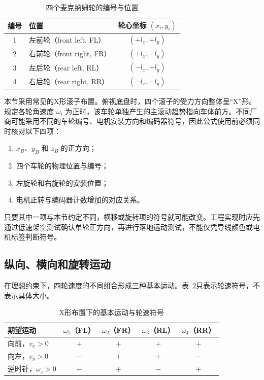 \documentclass[UTF8,zihao=-4]{ctexart}
\begin{document}
\begin{table}[htbp]
  \centering
  \caption{四个麦克纳姆轮的编号与位置}
  \label{tab:wheel-numbering}
  \begin{tabular}{clc}
    \toprule
    编号 & 位置 & 轮心坐标 $(x_i,y_i)$ \\
    \midrule
    1 & 左前轮（front left, FL）  & $(+l_x,+l_y)$ \\
    2 & 右前轮（front right, FR） & $(+l_x,-l_y)$ \\
    3 & 左后轮（rear left, RL）   & $(-l_x,+l_y)$ \\
    4 & 右后轮（rear right, RR）  & $(-l_x,-l_y)$ \\
    \bottomrule
  \end{tabular}
\end{table}

本节采用常见的X形滚子布置。俯视底盘时，四个滚子的受力方向整体呈“X”形。规定各轮角速度 $\omega_i$ 为正时，该车轮单独产生的主滚动趋势指向车体前方。不同厂商可能采用不同的车轮编号、电机安装方向和编码器符号，因此公式使用前必须同时核对以下四项：
\begin{enumerate}
  \item $x_B$、$y_B$ 和 $z_B$ 的正方向；
  \item 四个车轮的物理位置与编号；
  \item 左旋轮和右旋轮的安装位置；
  \item 电机正转与编码器计数增加的对应关系。
\end{enumerate}

只要其中一项与本节约定不同，横移或旋转项的符号就可能改变。工程实现时应先通过低速架空测试确认单轮正方向，再进行落地运动测试，不能仅凭导线颜色或电机标签判断符号。

\subsection{纵向、横向和旋转运动}

在理想约束下，四轮速度的不同组合形成三种基本运动。表~\ref{tab:basic-motion}只表示轮速符号，不表示具体大小。

\begin{table}[htbp]
  \centering
  \caption{X形布置下的基本运动与轮速符号}
  \label{tab:basic-motion}
  \begin{tabular}{lcccc}
    \toprule
    期望运动 & $\omega_1$（FL） & $\omega_2$（FR） & $\omega_3$（RL） & $\omega_4$（RR） \\
    \midrule
    向前，$v_x>0$       & $+$ & $+$ & $+$ & $+$ \\
    向左，$v_y>0$       & $-$ & $+$ & $+$ & $-$ \\
    逆时针，$\omega_z>0$ & $-$ & $+$ & $-$ & $+$ \\
    \bottomrule
  \end{tabular}
\end{table}
\end{document}
